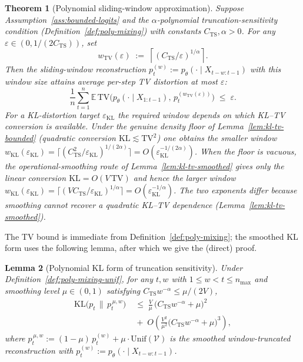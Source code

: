 \documentclass[11pt]{article}
\newcommand{\V}{\mathcal{V}}
\newcommand{\E}{\mathbb{E}}
\newcommand{\KLs}{\mathrm{KL}}
\newcommand{\TV}{\mathrm{TV}}
\theoremstyle{plain}
\newtheorem{theorem}{Theorem}[section]
\newtheorem{lemma}[theorem]{Lemma}
\theoremstyle{definition}
\theoremstyle{remark}
\begin{document}
\begin{theorem}[Polynomial sliding-window approximation]
\label{thm:E2-poly}
Suppose Assumption~\ref{ass:bounded-logits} and the
$\alpha$-polynomial truncation-sensitivity condition
(Definition~\ref{def:poly-mixing}) with constants
$C_{\mathrm{TS}}, \alpha > 0$. For any
$\varepsilon \in (0, 1/(2 C_{\mathrm{TS}}))$, set
\[
w_{\TV}(\varepsilon)
\;:=\; \left\lceil (C_{\mathrm{TS}}/\varepsilon)^{1/\alpha} \right\rceil.
\]
Then the sliding-window reconstruction
$p_t^{(w)} := p_\theta(\cdot \mid X_{t-w:t-1})$ with this window size
attains average per-step TV distortion at most $\varepsilon$:
\[
\frac{1}{n}\sum_{t=1}^n
\E\,\TV\bigl(p_\theta(\cdot \mid X_{1:t-1}),\, p_t^{(w_{\TV}(\varepsilon))}\bigr)
\;\leq\; \varepsilon .
\] For a KL-distortion target $\varepsilon_{\KLs}$ the required window
depends on which KL--TV conversion is available. Under the genuine
density floor of Lemma~\ref{lem:kl-tv-bounded} (quadratic conversion
$\KLs \lesssim \TV^2$) one obtains the smaller window
$w_{\KLs}(\varepsilon_{\KLs}) =
\lceil (C_{\mathrm{TS}}^2/\varepsilon_{\KLs})^{1/(2\alpha)} \rceil
= O(\varepsilon_{\KLs}^{-1/(2\alpha)})$. When the floor is vacuous, the
operational-smoothing route of Lemma~\ref{lem:kl-tv-smoothed} gives
only the \emph{linear} conversion $\KLs = O(V\,\TV)$ and hence the
larger window
$w_{\KLs}(\varepsilon_{\KLs}) =
\lceil (V C_{\mathrm{TS}}/\varepsilon_{\KLs})^{1/\alpha} \rceil
= O(\varepsilon_{\KLs}^{-1/\alpha})$. The two exponents differ because
smoothing cannot recover a quadratic KL--TV dependence
(Lemma~\ref{lem:kl-tv-smoothed}).
\end{theorem}

The TV bound is immediate from Definition~\ref{def:poly-mixing}; the
smoothed KL form uses the following lemma, after which we give the
(direct) proof.

\begin{lemma}[Polynomial KL form of truncation sensitivity]
\label{lem:poly-mixing-KL}
Under Definition~\ref{def:poly-mixing-unif}, for any $t, w$ with
$1 \leq w < t \leq n_{\max}$ and smoothing level $\mu \in (0, 1)$
satisfying $C_{\mathrm{TS}} w^{-\alpha} \leq \mu/(2V)$,
\[
\begin{split}
\KLs\bigl(p_t \,\|\, p_t^{\,\mu, w}\bigr)
&\;\leq\;
\frac{V}{\mu}\,\bigl(C_{\mathrm{TS}} w^{-\alpha} + \mu\bigr)^2\\
&\;+\; O\!\left(\frac{V^2}{\mu^2}
        \bigl(C_{\mathrm{TS}} w^{-\alpha} + \mu\bigr)^3\right),
\end{split}
\]
where
$p_t^{\,\mu, w} := (1-\mu)\,p_t^{(w)} + \mu\cdot\mathrm{Unif}(\V)$
is the smoothed window-truncated reconstruction with
$p_t^{(w)} := p_\theta(\cdot \mid X_{t-w:t-1})$.
\end{lemma}
\end{document}
